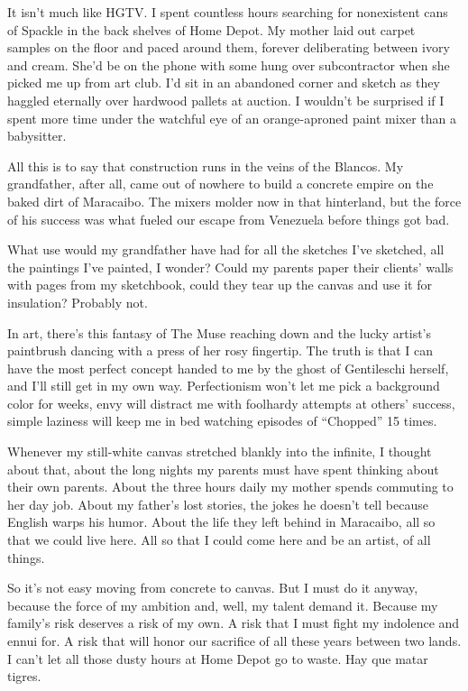 It isn't much like HGTV. I spent countless hours searching for
nonexistent cans of Spackle in the back shelves of Home Depot. My mother
laid out carpet samples on the floor and paced around them, forever
deliberating between ivory and cream. She'd be on the phone with some
hung over subcontractor when she picked me up from art club. I'd sit in
an abandoned corner and sketch as they haggled eternally over hardwood
pallets at auction. I wouldn't be surprised if I spent more time under
the watchful eye of an orange-aproned paint mixer than a babysitter.

All this is to say that construction runs in the veins of the Blancos.
My grandfather, after all, came out of nowhere to build a concrete
empire on the baked dirt of Maracaibo. The mixers molder now in that
hinterland, but the force of his success was what fueled our escape from
Venezuela before things got bad.

What use would my grandfather have had for all the sketches I've
sketched, all the paintings I've painted, I wonder? Could my parents
paper their clients' walls with pages from my sketchbook, could they
tear up the canvas and use it for insulation? Probably not.

In art, there's this fantasy of The Muse reaching down and the lucky
artist's paintbrush dancing with a press of her rosy fingertip. The
truth is that I can have the most perfect concept handed to me by the
ghost of Gentileschi herself, and I'll still get in my own way.
Perfectionism won't let me pick a background color for weeks, envy will
distract me with foolhardy attempts at others' success, simple laziness
will keep me in bed watching episodes of ``Chopped'' 15 times.

Whenever my still-white canvas stretched blankly into the infinite, I
thought about that, about the long nights my parents must have spent
thinking about their own parents. About the three hours daily my mother
spends commuting to her day job. About my father's lost stories, the
jokes he doesn't tell because English warps his humor. About the life
they left behind in Maracaibo, all so that we could live here. All so
that I could come here and be an artist, of all things.

So it's not easy moving from concrete to canvas. But I must do it
anyway, because the force of my ambition and, well, my talent demand it.
Because my family's risk deserves a risk of my own. A risk that I must
fight my indolence and ennui for. A risk that will honor our sacrifice
of all these years between two lands. I can't let all those dusty hours
at Home Depot go to waste. Hay que matar tigres.

